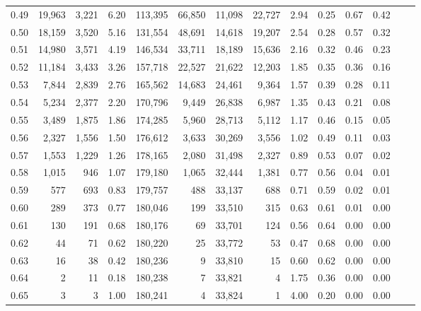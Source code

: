 \begin{tabular}{rrrrrrrrrrrrrr}
0.49 &  19,963 &  3,221 &    6.20 &  113,395 &   66,850 &  11,098 &  22,727 &  2.94 &  0.25 &  0.67 &      0.42 \\
0.50 &  18,159 &  3,520 &    5.16 &  131,554 &   48,691 &  14,618 &  19,207 &  2.54 &  0.28 &  0.57 &      0.32 \\
0.51 &  14,980 &  3,571 &    4.19 &  146,534 &   33,711 &  18,189 &  15,636 &  2.16 &  0.32 &  0.46 &      0.23 \\
0.52 &  11,184 &  3,433 &    3.26 &  157,718 &   22,527 &  21,622 &  12,203 &  1.85 &  0.35 &  0.36 &      0.16 \\
0.53 &   7,844 &  2,839 &    2.76 &  165,562 &   14,683 &  24,461 &   9,364 &  1.57 &  0.39 &  0.28 &      0.11 \\
0.54 &   5,234 &  2,377 &    2.20 &  170,796 &    9,449 &  26,838 &   6,987 &  1.35 &  0.43 &  0.21 &      0.08 \\
0.55 &   3,489 &  1,875 &    1.86 &  174,285 &    5,960 &  28,713 &   5,112 &  1.17 &  0.46 &  0.15 &      0.05 \\
0.56 &   2,327 &  1,556 &    1.50 &  176,612 &    3,633 &  30,269 &   3,556 &  1.02 &  0.49 &  0.11 &      0.03 \\
0.57 &   1,553 &  1,229 &    1.26 &  178,165 &    2,080 &  31,498 &   2,327 &  0.89 &  0.53 &  0.07 &      0.02 \\
0.58 &   1,015 &    946 &    1.07 &  179,180 &    1,065 &  32,444 &   1,381 &  0.77 &  0.56 &  0.04 &      0.01 \\
0.59 &     577 &    693 &    0.83 &  179,757 &      488 &  33,137 &     688 &  0.71 &  0.59 &  0.02 &      0.01 \\
0.60 &     289 &    373 &    0.77 &  180,046 &      199 &  33,510 &     315 &  0.63 &  0.61 &  0.01 &      0.00 \\
0.61 &     130 &    191 &    0.68 &  180,176 &       69 &  33,701 &     124 &  0.56 &  0.64 &  0.00 &      0.00 \\
0.62 &      44 &     71 &    0.62 &  180,220 &       25 &  33,772 &      53 &  0.47 &  0.68 &  0.00 &      0.00 \\
0.63 &      16 &     38 &    0.42 &  180,236 &        9 &  33,810 &      15 &  0.60 &  0.62 &  0.00 &      0.00 \\
0.64 &       2 &     11 &    0.18 &  180,238 &        7 &  33,821 &       4 &  1.75 &  0.36 &  0.00 &      0.00 \\
0.65 &       3 &      3 &    1.00 &  180,241 &        4 &  33,824 &       1 &  4.00 &  0.20 &  0.00 &      0.00 \\

\end{tabular}
